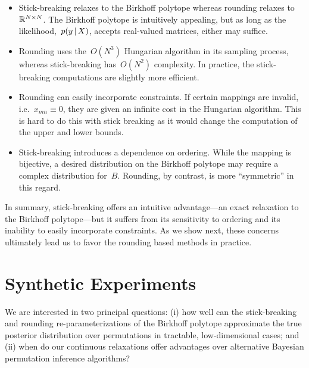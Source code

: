 \documentclass[twoside]{article}
\begin{document}
\begin{itemize}
\item Stick-breaking relaxes to the Birkhoff polytope whereas rounding
  relaxes to~$\mathbb{R}^{N \times N}$. The Birkhoff polytope is
  intuitively appealing, but as long as the
  likelihood,~$p(y \, | \, X)$, accepts real-valued matrices, either
  may suffice.
  
\item Rounding uses the~$O(N^3)$ Hungarian algorithm in its sampling
  process, whereas stick-breaking has~$O(N^2)$ complexity. In practice,
  the stick-breaking computations are slightly more efficient.
    
\item Rounding can easily incorporate constraints.  If certain
  mappings are invalid, i.e.~${x_{mn} \equiv 0}$, they are given an
  infinite cost in the Hungarian algorithm. This is hard to do this
  with stick breaking as it would change the computation of the upper
  and lower bounds. %
  
\item Stick-breaking introduces a dependence on ordering.  While the
  mapping is bijective, a desired distribution on the Birkhoff polytope
  may require a complex distribution for~$B$.  Rounding, by contrast,
  is more ``symmetric'' in this regard.
  
\end{itemize}

In summary, stick-breaking offers an intuitive advantage---an exact
relaxation to the Birkhoff polytope---but it suffers from its
sensitivity to ordering and its inability to easily incorporate
constraints.  As we show next, these concerns ultimately lead us to
favor the rounding based methods in practice.

\section{Synthetic Experiments}
\label{sec:synthetic}
We are interested in two principal questions: 
 (i) how well can the stick-breaking and rounding re-parameterizations
of the Birkhoff polytope approximate the true posterior distribution
over permutations in tractable, low-dimensional cases; and (ii)
when do our continuous relaxations offer
advantages over alternative  Bayesian permutation
inference algorithms?

\end{document}
